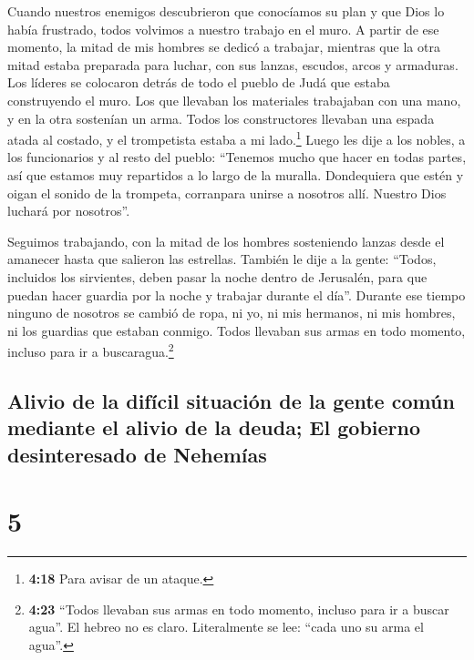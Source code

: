  Cuando nuestros enemigos descubrieron que conocíamos su
plan y que Dios lo había frustrado, todos volvimos a nuestro trabajo en
el muro.  A partir de ese momento, la mitad de mis
hombres se dedicó a trabajar, mientras que la otra mitad estaba
preparada para luchar, con sus lanzas, escudos, arcos y armaduras. Los
líderes se colocaron detrás de todo el pueblo de Judá 
que estaba construyendo el muro. Los que llevaban los materiales
trabajaban con una mano, y en la otra sostenían un arma. 
Todos los constructores llevaban una espada atada al costado, y el
trompetista estaba a mi lado.\footnote{\textbf{4:18} Para avisar de un
  ataque.}  Luego les dije a los nobles, a los
funcionarios y al resto del pueblo: ``Tenemos mucho que hacer en todas
partes, así que estamos muy repartidos a lo largo de la muralla.
 Dondequiera que estén y oigan el sonido de la trompeta,
corranpara unirse a nosotros allí. Nuestro Dios luchará por nosotros''.

 Seguimos trabajando, con la mitad de los hombres
sosteniendo lanzas desde el amanecer hasta que salieron las estrellas.
 También le dije a la gente: ``Todos, incluidos los
sirvientes, deben pasar la noche dentro de Jerusalén, para que puedan
hacer guardia por la noche y trabajar durante el día''. 
Durante ese tiempo ninguno de nosotros se cambió de ropa, ni yo, ni mis
hermanos, ni mis hombres, ni los guardias que estaban conmigo. Todos
llevaban sus armas en todo momento, incluso para ir a
buscaragua.\footnote{\textbf{4:23} ``Todos llevaban sus armas en todo
  momento, incluso para ir a buscar agua''. El hebreo no es claro.
  Literalmente se lee: ``cada uno su arma el agua''.}

\hypertarget{alivio-de-la-difuxedcil-situaciuxf3n-de-la-gente-comuxfan-mediante-el-alivio-de-la-deuda-el-gobierno-desinteresado-de-nehemuxedas}{%
\subsection{Alivio de la difícil situación de la gente común mediante el
alivio de la deuda; El gobierno desinteresado de
Nehemías}\label{alivio-de-la-difuxedcil-situaciuxf3n-de-la-gente-comuxfan-mediante-el-alivio-de-la-deuda-el-gobierno-desinteresado-de-nehemuxedas}}

\hypertarget{section-4}{%
\section{5}\label{section-4}}

